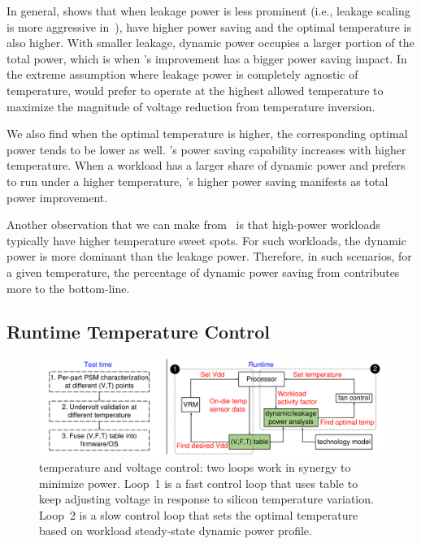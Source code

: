 In general,  shows that when leakage power is less prominent (i.e., leakage scaling is more aggressive in~), \tistates have higher power saving and the optimal temperature is also higher. With smaller leakage, dynamic power occupies a larger portion of the total power, which is when \tistate's improvement has a bigger power saving impact. In the extreme assumption where leakage power is completely agnostic of temperature, \tistate would prefer to operate at the highest allowed temperature to maximize the magnitude of voltage reduction from temperature inversion.

We also find when the optimal temperature is higher, the corresponding optimal power tends to be lower as well.  \tistate's power saving capability increases with higher temperature. When a workload has a larger share of dynamic power and prefers to run under a higher temperature, \tistate's higher power saving manifests as total power improvement.

Another observation that we can make from~ is that high-power workloads typically have higher temperature sweet spots. For such workloads, the dynamic power is more dominant than the leakage power. Therefore, in such scenarios, for a given temperature, the percentage of dynamic power saving from \tistate contributes more to the bottom-line.

\subsection{Runtime Temperature Control}
\label{sec:runtime}

\begin{figure}[t!]
\centering
    \includegraphics[trim=0 0 0 0,clip,width=.96\linewidth]{graphs/temperature/runtime-mechanism_v3.pdf}
    \caption{\tistate temperature and voltage control: two loops work in synergy to minimize power. Loop~1 is a fast control loop that uses \tistate table to keep adjusting voltage in response to silicon temperature variation. Loop~2 is a slow control loop that sets the optimal temperature based on workload steady-state dynamic power profile.}
    \label{fig:runtime}
    \vspace*{-.1in}
\end{figure}

